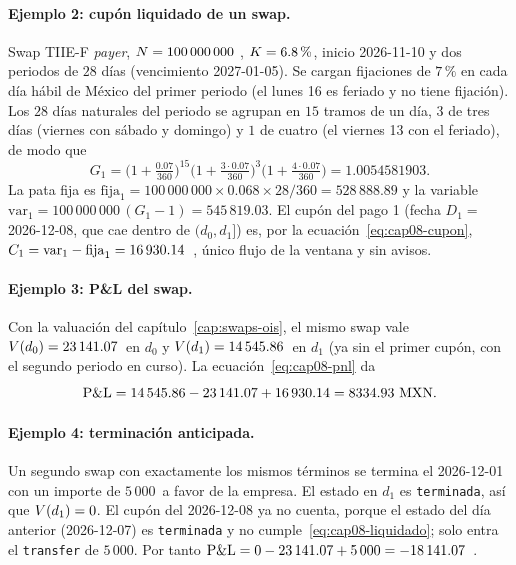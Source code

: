 \paragraph{Ejemplo 2: cupón liquidado de un swap.} Swap TIIE-F \emph{payer}, $\Nom = 100\,000\,000$ \MXN, $\K = 6.8\,\%$, inicio 2026-11-10 y dos periodos de $28$ días (vencimiento 2027-01-05). Se cargan fijaciones de $7\,\%$ en cada día hábil de México del primer periodo (el lunes 16 es feriado y no tiene fijación). Los $28$ días naturales del periodo se agrupan en $15$ tramos de un día, $3$ de tres días (viernes con sábado y domingo) y $1$ de cuatro (el viernes 13 con el feriado), de modo que
\[
  G_1 = \bigl(1 + \tfrac{0.07}{360}\bigr)^{15}\bigl(1 + \tfrac{3\cdot 0.07}{360}\bigr)^{3}\bigl(1 + \tfrac{4\cdot 0.07}{360}\bigr) = 1.0054581903.
\]
La pata fija es $\mathrm{fija}_1 = 100\,000\,000 \times 0.068 \times 28/360 = 528\,888.89$ y la variable $\mathrm{var}_1 = 100\,000\,000\,(G_1 - 1) = 545\,819.03$. El cupón del pago 1 (fecha $D_1 = $ 2026-12-08, que cae dentro de $(d_0, d_1]$) es, por la ecuación~\eqref{eq:cap08-cupon}, $C_1 = \mathrm{var}_1 - \mathrm{fija}_1 = \verif{cap08-cupon-irs}{16930.14}$~\MXN, único flujo de la ventana y sin avisos.

\paragraph{Ejemplo 3: P\&L del swap.} Con la valuación del capítulo~\ref{cap:swaps-ois}, el mismo swap vale $\PV(d_0) = \verif{cap08-pv-irs-inicial}{23141.07}$~\MXN en $d_0$ y $\PV(d_1) = \verif{cap08-pv-irs-final}{14545.86}$~\MXN en $d_1$ (ya sin el primer cupón, con el segundo periodo en curso). La ecuación~\eqref{eq:cap08-pnl} da
\[
  \PnL = 14\,545.86 - 23\,141.07 + 16\,930.14 = \verif{cap08-pnl-irs}{8334.93}~\MXN.
\]

\paragraph{Ejemplo 4: terminación anticipada.} Un segundo swap con exactamente los mismos términos se termina el 2026-12-01 con un importe de $5\,000$~\MXN a favor de la empresa. El estado en $d_1$ es \texttt{terminada}, así que $\PV(d_1) = 0$. El cupón del 2026-12-08 ya no cuenta, porque el estado del día anterior (2026-12-07) es \texttt{terminada} y no cumple~\eqref{eq:cap08-liquidado}; solo entra el \texttt{transfer} de $5\,000$. Por tanto $\PnL = 0 - 23\,141.07 + 5\,000 = \verif{cap08-pnl-terminacion}{-18141.07}$~\MXN.


